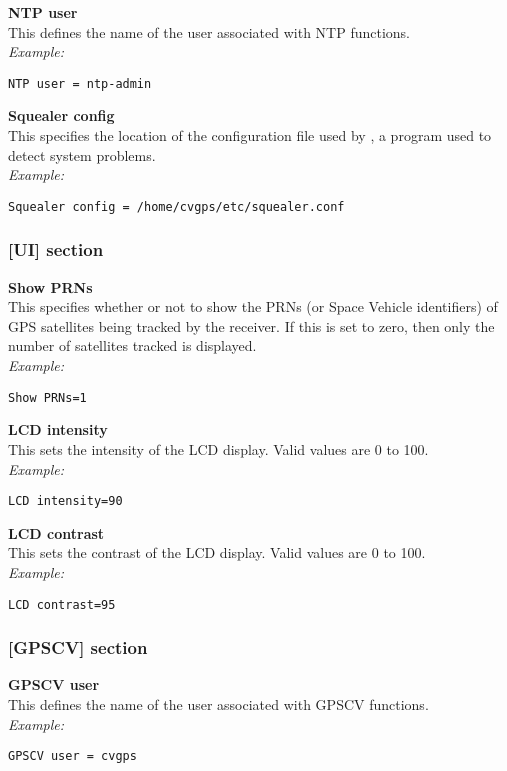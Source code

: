 {\bfseries NTP user}\\
This  defines the name of the user associated with NTP functions.\\
\textit{Example:}
\begin{lstlisting}
NTP user = ntp-admin
\end{lstlisting}

{\bfseries Squealer config}\\
This  specifies the location of the configuration file used by , a
program used to detect system problems.\\
\textit{Example:}
\begin{lstlisting}
Squealer config = /home/cvgps/etc/squealer.conf
\end{lstlisting}

\subsubsection{[UI] section}
{\bfseries Show PRNs}\\
This specifies whether or not to show the PRNs (or Space Vehicle identifiers) of
GPS satellites being tracked by the receiver. If this is set to zero, then only
the number of satellites tracked is displayed.\\
\textit{Example:}
\begin{lstlisting}
Show PRNs=1
\end{lstlisting}

{\bfseries LCD intensity}\\
This sets the intensity of the LCD display. Valid values are 0 to 100.\\
\textit{Example:}
\begin{lstlisting}
LCD intensity=90
\end{lstlisting}

{\bfseries LCD contrast}\\
This sets the contrast of the LCD display. Valid values are 0 to 100.\\
\textit{Example:}
\begin{lstlisting}
LCD contrast=95
\end{lstlisting}

\subsubsection{[GPSCV] section}
{\bfseries GPSCV user}\\
This  defines the name of the user associated with GPSCV functions.\\
\textit{Example:}
\begin{lstlisting}
GPSCV user = cvgps
\end{lstlisting}


